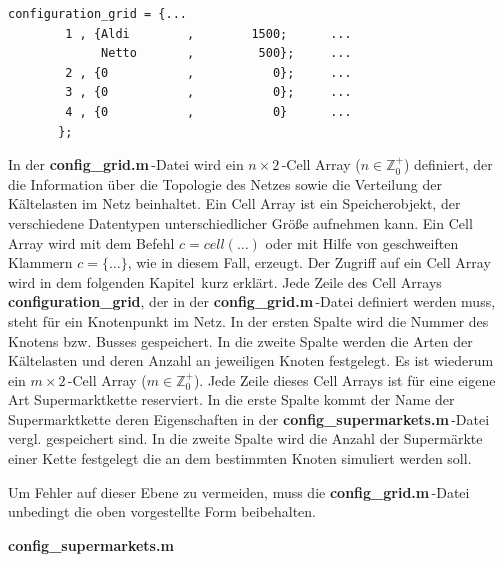 \begin{lstlisting}[float=h,caption={config\_grid.m},label={cgrid}]
%%	Bus,  Supermarkets,	  Number of Supermarkets
configuration_grid = {...
        1 , {Aldi	     ,	      1500;	     ...
             Netto	     ,	       500};	 ...
        2 , {0	         ,           0};	 ...
        3 , {0	         ,           0};	 ...
        4 , {0	         ,           0}	     ...
       };
\end{lstlisting}

In der \textbf{config\_grid.m}$\,$-Datei wird  ein $n\times2\,$-Cell Array
($n\in \mathbb{Z}^+_0$) definiert, der die Information über die Topologie des
Netzes sowie die Verteilung der Kältelasten im Netz beinhaltet. Ein Cell Array
ist ein Speicherobjekt, der verschiedene Datentypen unterschiedlicher Größe
aufnehmen kann\cite[Teil 2, Seite 15]{MATLAB-Buch}.  Ein Cell Array wird mit dem
Befehl $c=cell(\ldots)$ oder mit Hilfe von geschweiften Klammern $c=\{\ldots\}$,
wie in diesem Fall, erzeugt. Der Zugriff auf ein Cell Array wird in dem
folgenden Kapitel$\,$ kurz
erklärt. Jede Zeile des Cell Arrays
\textbf{configuration\_grid}, der in der \textbf{config\_grid.m}$\,$-Datei
definiert werden muss, steht für ein Knotenpunkt im Netz. In der ersten Spalte
wird die Nummer des Knotens bzw. Busses gespeichert. In die zweite Spalte werden
die Arten der Kältelasten und deren Anzahl an jeweiligen Knoten festgelegt. Es
ist wiederum ein $m\times2\,$-Cell Array ($m\in \mathbb{Z}^+_0$). Jede Zeile
dieses Cell Arrays ist für eine eigene Art Supermarktkette reserviert. In die
erste Spalte kommt der Name der Supermarktkette deren Eigenschaften in der
\textbf{config\_supermarkets.m$\,$}-Datei vergl.   gespeichert
sind. In die zweite Spalte wird die Anzahl der Supermärkte einer Kette
festgelegt die an dem bestimmten Knoten simuliert werden soll.

Um Fehler auf dieser Ebene zu vermeiden, muss die
\textbf{config\_grid.m}$\,$-Datei unbedingt die oben vorgestellte Form
beibehalten.

\vspace{3mm}
\noindent\textbf{config\_supermarkets.m}
\vspace{3mm}


